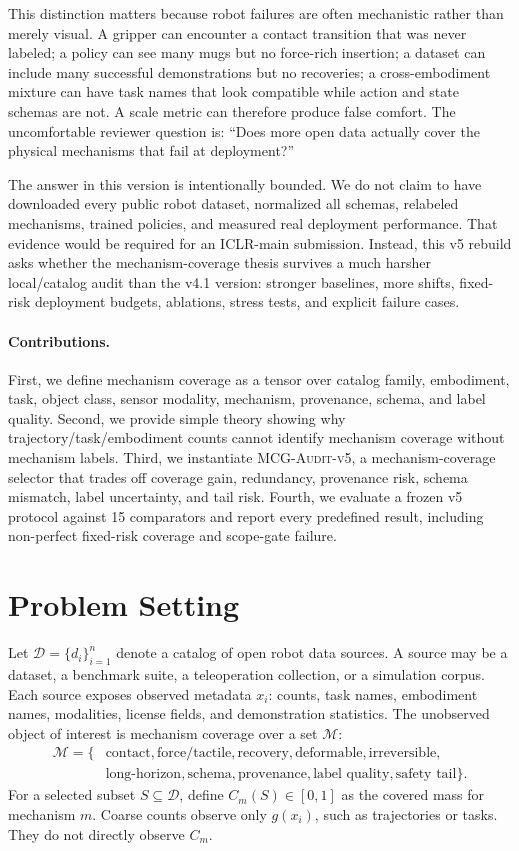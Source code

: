 \documentclass{article}
\newcommand{\method}{\textsc{MCG-Audit-v5}}
\begin{document}
This distinction matters because robot failures are often mechanistic rather than merely visual. A gripper can encounter a contact transition that was never labeled; a policy can see many mugs but no force-rich insertion; a dataset can include many successful demonstrations but no recoveries; a cross-embodiment mixture can have task names that look compatible while action and state schemas are not. A scale metric can therefore produce false comfort. The uncomfortable reviewer question is: ``Does more open data actually cover the physical mechanisms that fail at deployment?''

The answer in this version is intentionally bounded. We do not claim to have downloaded every public robot dataset, normalized all schemas, relabeled mechanisms, trained policies, and measured real deployment performance. That evidence would be required for an ICLR-main submission. Instead, this v5 rebuild asks whether the mechanism-coverage thesis survives a much harsher local/catalog audit than the v4.1 version: stronger baselines, more shifts, fixed-risk deployment budgets, ablations, stress tests, and explicit failure cases.

\paragraph{Contributions.}
First, we define mechanism coverage as a tensor over catalog family, embodiment, task, object class, sensor modality, mechanism, provenance, schema, and label quality. Second, we provide simple theory showing why trajectory/task/embodiment counts cannot identify mechanism coverage without mechanism labels. Third, we instantiate \method{}, a mechanism-coverage selector that trades off coverage gain, redundancy, provenance risk, schema mismatch, label uncertainty, and tail risk. Fourth, we evaluate a frozen v5 protocol against 15 comparators and report every predefined result, including non-perfect fixed-risk coverage and scope-gate failure.

\section{Problem Setting}
Let $\mathcal{D}=\{d_i\}_{i=1}^n$ denote a catalog of open robot data sources. A source may be a dataset, a benchmark suite, a teleoperation collection, or a simulation corpus. Each source exposes observed metadata $x_i$: counts, task names, embodiment names, modalities, license fields, and demonstration statistics. The unobserved object of interest is mechanism coverage over a set $\mathcal{M}$:
\[
  \begin{aligned}
  \mathcal{M}=\{&\text{contact},\text{force/tactile},\text{recovery},\text{deformable},\text{irreversible},\\
  &\text{long-horizon},\text{schema},\text{provenance},\text{label quality},\text{safety tail}\}.
  \end{aligned}
\]
For a selected subset $S\subseteq\mathcal{D}$, define $C_m(S)\in[0,1]$ as the covered mass for mechanism $m$. Coarse counts observe only $g(x_i)$, such as trajectories or tasks. They do not directly observe $C_m$.
\end{document}
